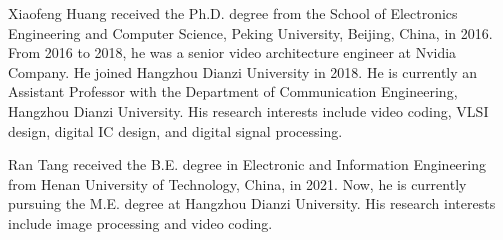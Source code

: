 \documentclass[lettersize,journal]{IEEEtran}
\begin{document}




\begin{IEEEbiography}
 {Xiaofeng Huang} received the Ph.D. degree from the School of Electronics Engineering and Computer Science, Peking University, Beijing, China, in 2016. From 2016 to 2018, he was a senior video architecture engineer at Nvidia Company. He joined Hangzhou Dianzi University in 2018. He is currently an Assistant Professor with the Department of Communication Engineering, Hangzhou Dianzi University. His research interests include video coding, VLSI design, digital IC design, and digital signal processing.
\end{IEEEbiography}

\begin{IEEEbiography}
 {Ran Tang} received the B.E. degree in Electronic and Information Engineering from Henan University of Technology, China, in 2021. Now, he is currently pursuing the M.E. degree at Hangzhou Dianzi University. His research interests include image processing and video coding.
\end{IEEEbiography}
\end{document}
